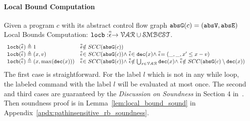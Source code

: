 \paragraph*{Local Bound Computation}
Given a program $c$ with its abstract control flow graph 
$\absG(c) = (\absV, \absE)$
\\
Local Bounds Computation:
$\locbound: \absevent \to \mathcal{VAR} \cup \constdom$.
%
\[ 
\begin{array}{ll}
  \locbound(\absevent) \triangleq 1 
  & \absevent \notin SCC(\absG(c))
  \\
  \locbound(\absevent) \triangleq (x, v) 
  & \absevent \in SCC(\absG(c)) \land \absevent \in \dec(x) \land  \absevent = (\_, \_ , x' \leq x - v) \\
  \locbound(\absevent) \triangleq (x, \max(\dec(x))) 
  & \absevent \in SCC(\absG(c)) \land 
  \absevent  \notin \bigcup_{x \in \mathcal{VAR}} \dec(x)
  \land \absevent \notin SCC(\absG(c) \setminus \dec(x)) 
\end{array}
  \]
  The first case is straightforward. 
  For the label $l$ which is not in any while loop, 
  the labeled command with the label $l$ will be 
  evaluated at most once. 
  The second and third cases are guaranteed by the \emph{Discussion on Soundness} in Section 4 in~\cite{sinn2017complexity}.
  Then soundness proof is in Lemma~\ref{lem:local_bound_sound} in Appendix~\ref{apdx:pathinsensitive_rb_soundness}.
%
